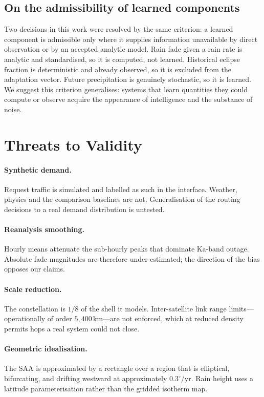 \documentclass[10pt,twocolumn]{article}
\newcommand{\km}{\,\mathrm{km}}
\begin{document}
\subsection{On the admissibility of learned components}

Two decisions in this work were resolved by the same criterion: a learned
component is admissible only where it supplies information unavailable by direct
observation or by an accepted analytic model. Rain fade given a rain rate is
analytic and standardised, so it is computed, not learned. Historical eclipse
fraction is deterministic and already observed, so it is excluded from the
adaptation vector. Future precipitation is genuinely stochastic, so it is
learned. We suggest this criterion generalises: systems that learn quantities
they could compute or observe acquire the appearance of intelligence and the
substance of noise.

\section{Threats to Validity}
\label{sec:threats}

\paragraph{Synthetic demand.} Request traffic is simulated and labelled as such
in the interface. Weather, physics and the comparison baselines are not.
Generalisation of the routing decisions to a real demand distribution is
untested.

\paragraph{Reanalysis smoothing.} Hourly means attenuate the sub-hourly peaks
that dominate Ka-band outage. Absolute fade magnitudes are therefore
under-estimated; the direction of the bias opposes our claims.

\paragraph{Scale reduction.} The constellation is $1/8$ of the shell it models.
Inter-satellite link range limits---operationally of order $5{,}400\km$---are not
enforced, which at reduced density permits hops a real system could not close.

\paragraph{Geometric idealisation.} The SAA is approximated by a rectangle over a
region that is elliptical, bifurcating, and drifting westward at approximately
$0.3^{\circ}$/yr. Rain height uses a latitude parameterisation rather than the
gridded isotherm map.
\end{document}
